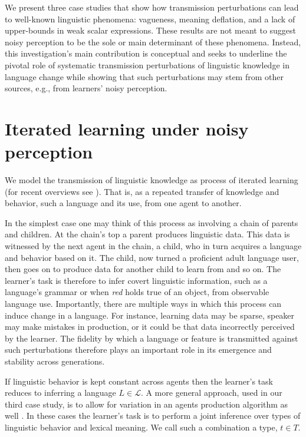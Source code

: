 \documentclass[10pt,a4paper]{article}
\begin{document}
We present three case studies that show how transmission perturbations can lead to well-known linguistic phenomena: vagueness, meaning deflation, and a lack of upper-bounds in weak scalar expressions. These results are not meant to suggest noisy perception to be the sole or main determinant of these phenomena. Instead, this investigation's main contribution is conceptual and seeks to underline the pivotal role of systematic transmission perturbations of linguistic knowledge in language change while showing that such perturbations may stem from other sources, e.g., from learners' noisy perception.


\section{Iterated learning under noisy perception}
We model the transmission of linguistic knowledge as process of iterated learning (for recent overviews see \citealt{kirby+etal:2014, tamariz+kirby:2016}). That is, as a repeated transfer of knowledge and behavior, such a language and its use, from one agent to another. 

In the simplest case one may think of this process as involving a chain of parents and children. At the chain's top a parent produces linguistic data. This data is witnessed by the next agent in the chain, a child, who in turn acquires a language and behavior based on it. The child, now turned a proficient adult language user, then goes on to produce data for another child to learn from and so on. The learner's task is therefore to infer covert linguistic information, such as a language's grammar or when {\em red} holds true of an object, from observable language use. Importantly, there are multiple ways in which this process can induce change in a language. For instance, learning data may be sparse, speaker may make mistakes in production, or it could be that data incorrectly perceived by the learner. The fidelity by which a language or feature is transmitted against such perturbations therefore plays an important role in its emergence and stability across generations.

If linguistic behavior is kept constant across agents then the learner's task reduces to inferring a language $L \in \mathcal{L}$. A more general approach, used in our third case study, is to allow for variation in an agents production algorithm as well \citep{brochhagen+etal:2016:CogSci}. In these cases the learner's task is to perform a joint inference over types of linguistic behavior and lexical meaning. We call such a combination a type, $t \in T$. 
\end{document}
